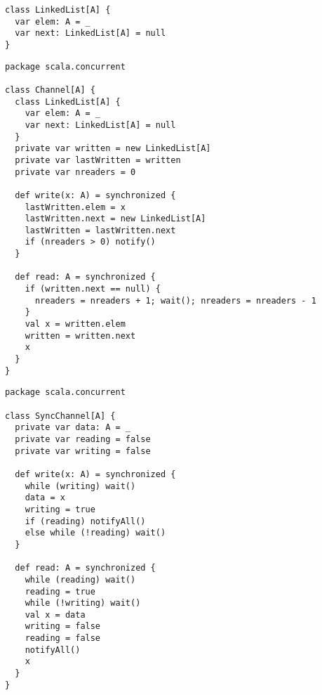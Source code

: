 
\begin{lstlisting}
class LinkedList[A] {
  var elem: A = _
  var next: LinkedList[A] = null
}
\end{lstlisting}

\begin{lstlisting}
package scala.concurrent

class Channel[A] {
  class LinkedList[A] {
    var elem: A = _
    var next: LinkedList[A] = null
  }
  private var written = new LinkedList[A]
  private var lastWritten = written
  private var nreaders = 0

  def write(x: A) = synchronized {
    lastWritten.elem = x
    lastWritten.next = new LinkedList[A]
    lastWritten = lastWritten.next
    if (nreaders > 0) notify()
  }

  def read: A = synchronized {
    if (written.next == null) {
      nreaders = nreaders + 1; wait(); nreaders = nreaders - 1
    }
    val x = written.elem
    written = written.next
    x
  }
}
\end{lstlisting}


\begin{lstlisting}
package scala.concurrent

class SyncChannel[A] {
  private var data: A = _
  private var reading = false
  private var writing = false

  def write(x: A) = synchronized {
    while (writing) wait()
    data = x
    writing = true
    if (reading) notifyAll()
    else while (!reading) wait()
  }

  def read: A = synchronized {
    while (reading) wait()
    reading = true
    while (!writing) wait()
    val x = data
    writing = false
    reading = false
    notifyAll()
    x
  }
}
\end{lstlisting}

